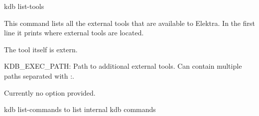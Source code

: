 {\ttfamily kdb list-\/tools}

This command lists all the external tools that are available to Elektra. In the first line it prints where external tools are located.

The tool itself is extern.


\begin{DoxyItemize}
\item {\ttfamily K\+D\+B\+\_\+\+E\+X\+E\+C\+\_\+\+P\+A\+TH}\+: Path to additional external tools. Can contain multiple paths separated with \+:.
\end{DoxyItemize}

Currently no option provided.


\begin{DoxyItemize}
\item {\ttfamily kdb list-\/commands} to list internal kdb commands 
\end{DoxyItemize}